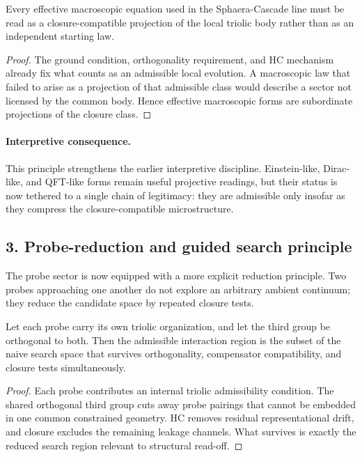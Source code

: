 \begin{proposition}
\label{prop:micro-to-macro}
Every effective macroscopic equation used in the Sphaera-Cascade line must be
read as a closure-compatible projection of the local triolic body rather than
as an independent starting law.
\end{proposition}

\begin{proof}
The ground condition, orthogonality requirement, and HC mechanism already fix
what counts as an admissible local evolution. A macroscopic law that failed to
arise as a projection of that admissible class would describe a sector not
licensed by the common body. Hence effective macroscopic forms are subordinate
projections of the closure class.
\end{proof}

\paragraph{Interpretive consequence.}
This principle strengthens the earlier interpretive discipline. Einstein-like,
Dirac-like, and QFT-like forms remain useful projective readings, but their
status is now tethered to a single chain of legitimacy: they are admissible
only insofar as they compress the closure-compatible microstructure.

\subsection*{3. Probe-reduction and guided search principle}
The probe sector is now equipped with a more explicit reduction principle. Two
probes approaching one another do not explore an arbitrary ambient continuum;
they reduce the candidate space by repeated closure tests.

\begin{lemma}
\label{lem:probe-reduction-lemma}
Let each probe carry its own triolic organization, and let the third group be
orthogonal to both. Then the admissible interaction region is the subset of the
naive search space that survives orthogonality, compensator compatibility, and
closure tests simultaneously.
\end{lemma}

\begin{proof}
Each probe contributes an internal triolic admissibility condition. The shared
orthogonal third group cuts away probe pairings that cannot be embedded in one
common constrained geometry. HC removes residual representational drift, and
closure excludes the remaining leakage channels. What survives is exactly the
reduced search region relevant to structural read-off.
\end{proof}

